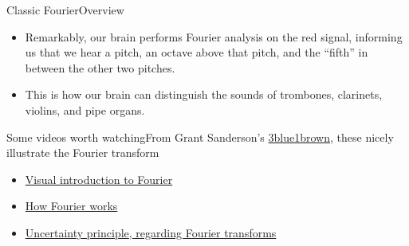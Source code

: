 \begin{frame}{Classic Fourier}{Overview}
\Vskip{-3em}%
%
\Vskip{-1.5em}\begin{itemize}
    \item Remarkably, our brain performs Fourier analysis on the red signal, informing us that we hear a pitch, an octave above that pitch, and the ``fifth'' in between the other two pitches.
    \item This is how our brain can distinguish the sounds of trombones, clarinets, violins, and pipe organs.
   
\end{itemize}%

\end{frame}

\begin{frame}{Some videos worth watching}{From Grant Sanderson's \href{https://www.3blue1brown.com/}{3blue1brown}, these nicely illustrate the Fourier transform}

\begin{itemize}
    \item \href{https://www.youtube.com/watch?v=spUNpyF58BY}{Visual introduction to Fourier}
    \item \href{https://www.youtube.com/watch?v=r6sGWTCMz2k}{How Fourier works}
    \item \href{https://www.youtube.com/watch?v=MBnnXbOM5S4}{Uncertainty principle, regarding Fourier transforms}
\end{itemize}
    
\end{frame}


